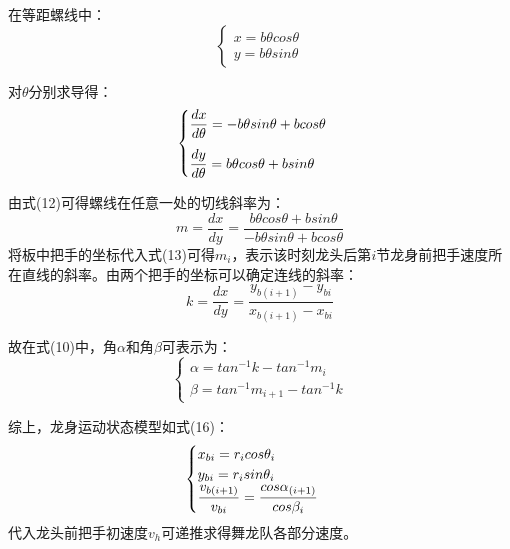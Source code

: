 \documentclass[withoutpreface,bwprint]{cumcmthesis} %
\begin{document}
	在等距螺线中：
	\begin{equation}
		\begin{cases}
			x=b\theta cos\theta\\
			y=b\theta sin\theta
		\end{cases}
	\end{equation}
	
	对$\theta$分别求导得：
	\begin{equation}
		\begin{cases}
			\vspace{\topsep}
			\dfrac{dx}{d\theta}=-b\theta sin\theta +bcos\theta\\
			\dfrac{dy}{d\theta}=b\theta cos\theta +bsin\theta
		\end{cases}
	\end{equation}
	
	由式(12)可得螺线在任意一处的切线斜率为：
	\begin{equation}
		m=\dfrac{dx}{dy}=\dfrac{b\theta cos\theta+bsin\theta}{-b\theta sin\theta+bcos\theta}
	\end{equation}
	将板中把手的坐标代入式(13)可得$m_i$，表示该时刻龙头后第$i$节龙身前把手速度所在直线的斜率。由两个把手的坐标可以确定连线的斜率：
	\begin{equation}
		k=\dfrac{dx}{dy}=\dfrac{y_{b(i+1)}-y_{bi}}{x_{b(i+1)}-x_{bi}}
	\end{equation}

	故在式(10)中，角$\alpha$和角$\beta$可表示为：
	\begin{equation}
		\begin{cases}
			\alpha=tan^{-1}k-tan^{-1}m_i\\
			\beta=tan^{-1}m_{i+1}-tan^{-1}k
		\end{cases}
	\end{equation}
	
	综上，龙身运动状态模型如式(16)：
	\begin{equation}
		\begin{cases}
			\setlength\abovedisplayskip{5pt}
			\setlength\belowdisplayskip{5pt}
			x_{bi}=r_icos\theta_i\\
			y_{bi}=r_isin\theta_i\\
			\dfrac{v_{b(i+1)}}{v_{bi}}=\dfrac{cos\alpha_{(i+1)}}{cos\beta_i}
		\end{cases}
	\end{equation}
	代入龙头前把手初速度$v_h$可递推求得舞龙队各部分速度。
\end{document}
